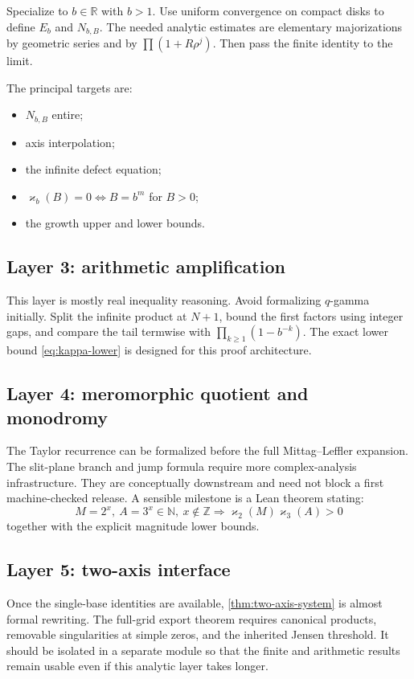 \documentclass[11pt]{article}
\theoremstyle{definition}
\newcommand{\kk}{\varkappa}
\newcommand{\N}{\mathbb{N}}
\newcommand{\Z}{\mathbb{Z}}
\newcommand{\R}{\mathbb{R}}
\begin{document}
Specialize to $b\in\R$ with $b>1$.  Use uniform convergence on compact disks to define $E_b$ and $N_{b,B}$.  The needed analytic estimates are elementary majorizations by geometric series and by $\prod(1+R\rho^j)$.  Then pass the finite identity to the limit.

The principal targets are:
\begin{itemize}
  \item $N_{b,B}$ entire;
  \item axis interpolation;
  \item the infinite defect equation;
  \item $\kk_b(B)=0\iff B=b^m$ for $B>0$;
  \item the growth upper and lower bounds.
\end{itemize}

\subsection{Layer 3: arithmetic amplification}

This layer is mostly real inequality reasoning.  Avoid formalizing $q$-gamma initially.  Split the infinite product at $N+1$, bound the first factors using integer gaps, and compare the tail termwise with $\prod_{k\ge1}(1-b^{-k})$.  The exact lower bound \eqref{eq:kappa-lower} is designed for this proof architecture.

\subsection{Layer 4: meromorphic quotient and monodromy}

The Taylor recurrence can be formalized before the full Mittag--Leffler expansion.  The slit-plane branch and jump formula require more complex-analysis infrastructure.  They are conceptually downstream and need not block a first machine-checked release.  A sensible milestone is a Lean theorem stating:
\[
 M=2^x,\ A=3^x\in\N,\ x\notin\Z
 \Longrightarrow
 \kk_2(M)\kk_3(A)>0
\]
together with the explicit magnitude lower bounds.

\subsection{Layer 5: two-axis interface}

Once the single-base identities are available, \cref{thm:two-axis-system} is almost formal rewriting.  The full-grid export theorem requires canonical products, removable singularities at simple zeros, and the inherited Jensen threshold.  It should be isolated in a separate module so that the finite and arithmetic results remain usable even if this analytic layer takes longer.
\end{document}

